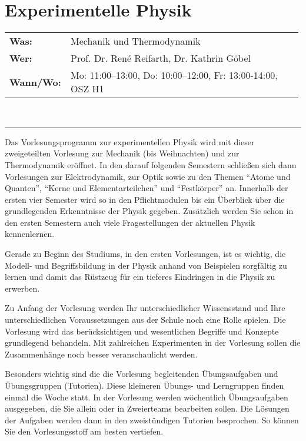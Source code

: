 \section{Experimentelle Physik}

\begin{tabular}{p{0.2\linewidth}p{0.79\linewidth}}
  \textbf{Was:} & Mechanik und Thermodynamik\\
  \textbf{Wer:} & Prof. Dr. Ren\'e Reifarth, Dr. Kathrin Göbel\\
  \textbf{Wann/Wo:} & Mo: 11:00--13:00, Do: 10:00--12:00, Fr: 13:00-14:00, OSZ H1\\
\end{tabular}\\
\rule{\textwidth}{0.1pt}
\bigskip 

Das Vorlesungsprogramm zur experimentellen Physik wird mit dieser zweigeteilten Vorlesung zur Mechanik (bis Weihnachten) und zur Thermodynamik eröffnet.
In den darauf folgenden Semestern schließen sich dann Vorlesungen zur Elektrodynamik, zur Optik sowie zu den Themen "`Atome und Quanten"', "`Kerne und Elementarteilchen"' und "`Festkörper"' an.
Innerhalb der ersten vier Semester wird so in den Pflichtmodulen  bis  ein Überblick über die grundlegenden Erkenntnisse der Physik gegeben.
Zusätzlich werden Sie schon in den ersten Semestern auch viele Fragestellungen der aktuellen Physik kennenlernen.

Gerade zu Beginn des Studiums, in den ersten Vorlesungen, ist es wichtig, die Modell- und Begriffsbildung in der Physik anhand von Beispielen sorgfältig zu lernen und damit das Rüstzeug für ein tieferes Eindringen in die Physik zu erwerben.  

Zu Anfang der Vorlesung werden Ihr unterschiedlicher Wissensstand und Ihre unterschiedlichen Voraussetzungen aus der Schule noch eine Rolle spielen.
Die Vorlesung wird das berücksichtigen und wesentlichen Begriffe und Konzepte grundlegend behandeln.
Mit zahlreichen Experimenten in der Vorlesung sollen die Zusammenhänge noch besser veranschaulicht werden.
 
Besonders wichtig sind die die Vorlesung begleitenden Übungsaufgaben und Übungsgruppen (Tutorien).
Diese kleineren Übungs- und Lerngruppen finden einmal die Woche statt.
In der Vorlesung werden wöchentlich Übungsaufgaben ausgegeben, die Sie allein oder in Zweierteams bearbeiten sollen.
Die Lösungen der Aufgaben werden dann in den zweistündigen Tutorien besprochen.
So können Sie den Vorlesungsstoff am besten vertiefen. 

